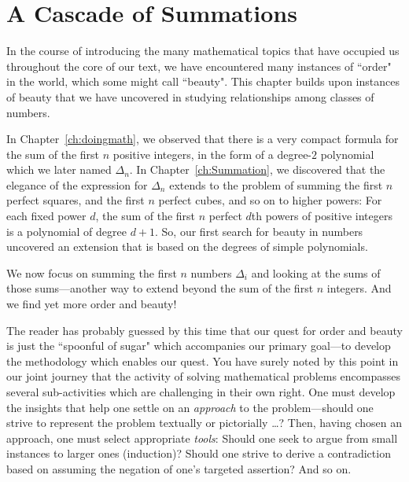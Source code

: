 
\chapter{A Cascade of Summations}
\label{Appendix:Tetra}

In the course of introducing the many mathematical topics that have occupied us throughout the core of our text, we have encountered many instances of ``order" in the world, which some might call ``beauty".  This chapter builds upon instances of beauty that we have uncovered in studying relationships among classes of numbers.

\medskip

In Chapter~\ref{ch:doingmath}, we observed that there is a very compact formula for the sum of the first $n$ positive integers, in the form of a degree-$2$ polynomial which we later named $\Delta_n$.  In Chapter~\ref{ch:Summation}, we discovered that the elegance of the expression for $\Delta_n$ extends to the problem of summing the first $n$ perfect squares, and the first $n$ perfect cubes, and so on to higher powers:  For each fixed power $d$, the sum of the first $n$ perfect $d$th powers of positive integers is a polynomial of degree $d+1$.  So, our first search for beauty in numbers uncovered an extension that is based on the degrees of simple polynomials.

\smallskip

We now focus on summing the first $n$ numbers $\Delta_i$ and looking at the sums of those sums---another way to extend beyond the sum of the first $n$ integers.  And we find yet more order and beauty!

\medskip

The reader has probably guessed by this time that our quest for order and beauty is just the ``spoonful of sugar" which accompanies our primary goal---to develop the methodology which enables our quest.  You have surely noted by this point in our joint journey that the activity of solving mathematical problems encompasses several sub-activities which are challenging in their own right.  One must develop the insights that help one settle on an {\em approach} to the problem---should one strive to represent the problem textually or pictorially \ldots?  Then, having chosen an approach, one must select appropriate {\em tools}:  Should one seek to argue from small instances to larger ones (induction)?  Should one strive to derive a contradiction based on assuming the negation of one's targeted assertion?  And so on.

